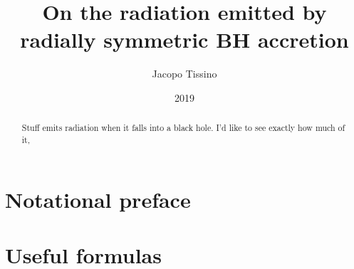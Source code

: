\documentclass[a4paper, 11pt]{article}
\title{On the radiation emitted by radially symmetric BH accretion}
\author{Jacopo Tissino}
\date{2019}
\begin{document}


\begin{abstract}
Stuff emits radiation when it falls into a black hole. I'd like to see exactly how much of it,
\end{abstract}

\section{Notational preface}



\section{Useful formulas}



\printbibliography[title={Bibliography}]
\end{document}

